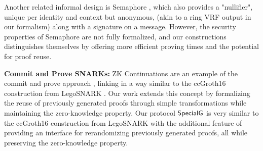 Another related informal design is Semaphore \cite{Semaphore}, which also provides a "nullifier", unique per identity and context but anonymous, (akin to a ring VRF output in our formalism) along with a signature on a message. However, the security properties of Semaphore are not fully formalized, and our constructions distinguishes themselves by offering more efficient proving times and the potential for proof reuse.



\noindent\textbf{Commit and Prove SNARKs:} ZK Continuations are an example of the commit and prove approach \cite{LegoSNARK}, linking  in a way similar to the ccGroth16 construction from LegoSNARK \cite{LegoSNARK}. Our work extends this concept by formalizing the reuse of previously generated proofs through simple transformations while maintaining the zero-knowledge property. Our protocol $ {\mathsf{SpecialG}} $ is very similar to the ccGroth16 construction from LegoSNARK \cite{LegoSNARK} with the additional feature of providing an interface for rerandomizing previously generated proofs, all while preserving the zero-knowledge property.